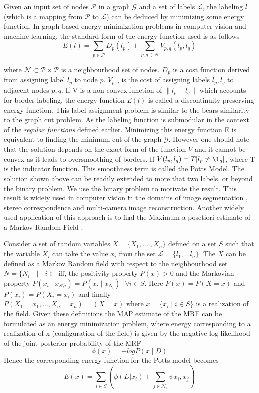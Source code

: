 Given an input set of nodes $\mathcal{P}$ in a graph $\mathcal{G}$ and a set of labels $\mathcal{L}$, the labeling $l$ (which is a mapping from $\mathcal{P}$ to $\mathcal{L}$) can be deduced by minimizing some energy function. In graph based energy minimization problems in computer vision and machine learning, the standard form of the energy function used is as follows
\[
E(l) = \underset{p\in\mathcal{P}}{\operatorname{\sum}} D_p(l_p) + \underset{p,q\in\mathcal{N}}{\operatorname{\sum}} V_{p,q}(l_p,l_q)
\]

where $\mathcal{N} \subset \mathcal{P}\times\mathcal{P}$ is a neighbourhood set of nodes. $D_p$ is a cost function derived from assigning label $l_p$ to node $p$. $V_{p,q}$ is the cost of assigning labels $l_p,l_q$ to adjacent nodes $p,q$. If V is a non-convex function of $\|l_p - l_q\|$ which accounts for border labeling, the energy function $E(l)$ is called a discontinuity preserving energy function. This label assignment problem is similar to the bears similarity to the graph cut problem. As the labeling function is submodular in the context of the {\it regular functions} defined earlier. Minimizing this energy function E is equivalent to finding the minimum cut of the graph $\mathcal{G}$. However one should note that the solution depends on the exact form of the function $V$ and it cannot be convex as it leads to oversmoothing of borders. If $V(l_p,l_q)=T[l_p\neq\l_q]$, where T is the indicator function. This smoothness term is called the Potts Model. The solution shown above can be readily extended to more that two labels, or beyond the binary problem. We use the binary problem to motivate the result. This result is widely used in computer vision in the domains of image segmentation , stereo correspondence and multi-camera image reconstruction. Another widely used application of this approach is to find the Maximum a posetiori estimate of a Markov Random Field \cite{MRFKohli}.

Consider a set of random variables $X = \{X_1,....,X_n\}$ defined on a set $S$ such that the variable $X_i$ can take the value $x_i$ from the set $\mathcal{L} = \{l_1,...l_n\}$. The $X$ can be defined as a Markov Random field with respect to the neighbourhood set $N = \{N_i \text{ } \mid \text{ } i\in$ iff, the positivity property $P(x) > 0$ and the Markovian property $P(x_i\mid x_{S\setminus {i}}) = P(x_i \mid x_{N_i}) \text{ } \forall i \in S$. Here $P(x) = P(X = x)$ and $P(x_i) = P(X_i = x_i)$ and finally $P(X_1 = x_1,...,X_n = x_n)  = (X = x) \text{ where } x = \{x_i \mid i\in S\}$ is a realization of the field. Given these definitions the MAP estimate of the MRF can be formulated as an energy minimization problem, where energy corresponding to a realization of x (configuration of the field) is given by the negative log likelihood of the joint posterior probability of the MRF
\[
\phi(x) = -logP(x\mid D)
\]
Hence the corresponding energy function for the Potts model becomes 
\[
E(x) =  \underset{i\in S}{\operatorname{\sum}} \left(\phi(D|x_i) + \underset{j\in \mathcal{N}_i}{\operatorname{\sum}}\psi{x_i,x_j} \right)
\]

